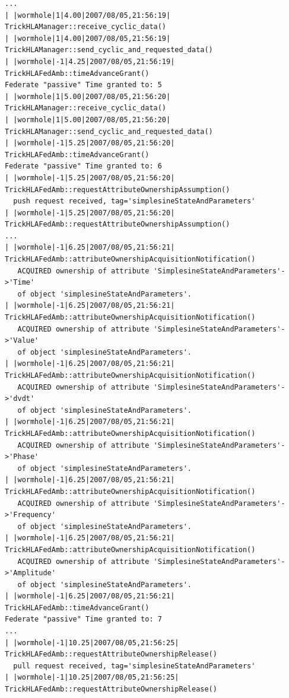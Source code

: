 \begin{lstlisting}[numbers=none,caption={Output stream from the passive ownerhsip transfer simulation}]
...
| |wormhole|1|4.00|2007/08/05,21:56:19| TrickHLAManager::receive_cyclic_data()
| |wormhole|1|4.00|2007/08/05,21:56:19| TrickHLAManager::send_cyclic_and_requested_data()
| |wormhole|-1|4.25|2007/08/05,21:56:19| TrickHLAFedAmb::timeAdvanceGrant()
Federate "passive" Time granted to: 5
| |wormhole|1|5.00|2007/08/05,21:56:20| TrickHLAManager::receive_cyclic_data()
| |wormhole|1|5.00|2007/08/05,21:56:20| TrickHLAManager::send_cyclic_and_requested_data()
| |wormhole|-1|5.25|2007/08/05,21:56:20| TrickHLAFedAmb::timeAdvanceGrant()
Federate "passive" Time granted to: 6
| |wormhole|-1|5.25|2007/08/05,21:56:20| TrickHLAFedAmb::requestAttributeOwnershipAssumption()
  push request received, tag='simplesineStateAndParameters'
| |wormhole|-1|5.25|2007/08/05,21:56:20| TrickHLAFedAmb::requestAttributeOwnershipAssumption()
...
| |wormhole|-1|6.25|2007/08/05,21:56:21| TrickHLAFedAmb::attributeOwnershipAcquisitionNotification()
   ACQUIRED ownership of attribute 'SimplesineStateAndParameters'->'Time'
   of object 'simplesineStateAndParameters'.
| |wormhole|-1|6.25|2007/08/05,21:56:21| TrickHLAFedAmb::attributeOwnershipAcquisitionNotification()
   ACQUIRED ownership of attribute 'SimplesineStateAndParameters'->'Value'
   of object 'simplesineStateAndParameters'.
| |wormhole|-1|6.25|2007/08/05,21:56:21| TrickHLAFedAmb::attributeOwnershipAcquisitionNotification()
   ACQUIRED ownership of attribute 'SimplesineStateAndParameters'->'dvdt'
   of object 'simplesineStateAndParameters'.
| |wormhole|-1|6.25|2007/08/05,21:56:21| TrickHLAFedAmb::attributeOwnershipAcquisitionNotification()
   ACQUIRED ownership of attribute 'SimplesineStateAndParameters'->'Phase'
   of object 'simplesineStateAndParameters'.
| |wormhole|-1|6.25|2007/08/05,21:56:21| TrickHLAFedAmb::attributeOwnershipAcquisitionNotification()
   ACQUIRED ownership of attribute 'SimplesineStateAndParameters'->'Frequency'
   of object 'simplesineStateAndParameters'.
| |wormhole|-1|6.25|2007/08/05,21:56:21| TrickHLAFedAmb::attributeOwnershipAcquisitionNotification()
   ACQUIRED ownership of attribute 'SimplesineStateAndParameters'->'Amplitude'
   of object 'simplesineStateAndParameters'.
| |wormhole|-1|6.25|2007/08/05,21:56:21| TrickHLAFedAmb::timeAdvanceGrant()
Federate "passive" Time granted to: 7
...
| |wormhole|-1|10.25|2007/08/05,21:56:25| TrickHLAFedAmb::requestAttributeOwnershipRelease()
  pull request received, tag='simplesineStateAndParameters'
| |wormhole|-1|10.25|2007/08/05,21:56:25| TrickHLAFedAmb::requestAttributeOwnershipRelease()

\end{lstlisting}
